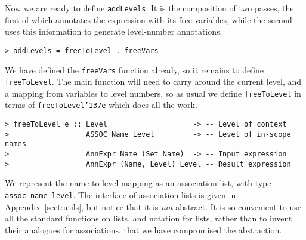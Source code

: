 Now we are ready to define \mbox{\tt addLevels}.  It is the composition of two
passes, the first of which annotates the expression with its free
variables, while the second uses this information to generate
level-number annotations.
\begin{verbatim}
> addLevels = freeToLevel . freeVars
\end{verbatim}
%
We have defined the \mbox{\tt freeVars} function already, so it remains to
define \mbox{\tt freeToLevel}.  The main function will need to carry around the
current level, and a mapping from variables to level numbers, so as
usual we define \mbox{\tt freeToLevel} in terms of \mbox{\tt freeToLevel{\char'137}e} which does
all the work.
\begin{verbatim}
> freeToLevel_e :: Level                    -> -- Level of context
>                  ASSOC Name Level         -> -- Level of in-scope names
>                  AnnExpr Name (Set Name)  -> -- Input expression
>                  AnnExpr (Name, Level) Level -- Result expression
\end{verbatim}
\par
We represent the name-to-level mapping as an association list, with
type \mbox{\tt assoc\ name\ level}.  The interface of association lists is given
in Appendix~\ref{sect:utils}, but notice that it is {\em not\/}
abstract.  It is so convenient to use all the standard functions on
lists, and notation for lists, rather than to invent their analogues
for associations, that we have compromised the abstraction.

